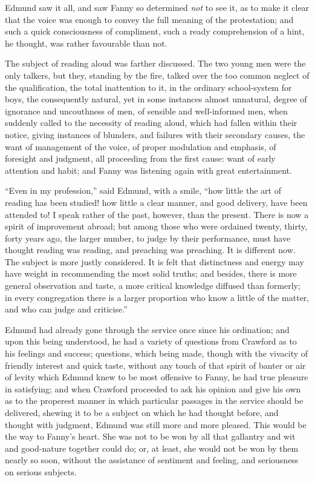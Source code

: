 \documentclass{article}
\begin{document}
Edmund saw it all, and saw Fanny so determined \emph{not} to see it,
as to make it clear that the voice was enough to convey
the full meaning of the protestation; and such a quick
consciousness of compliment, such a ready comprehension
of a hint, he thought, was rather favourable than not.

The subject of reading aloud was farther discussed.
The two young men were the only talkers, but they,
standing by the fire, talked over the too common neglect
of the qualification, the total inattention to it, in the
ordinary school-system for boys, the consequently natural,
yet in some instances almost unnatural, degree of ignorance
and uncouthness of men, of sensible and well-informed men,
when suddenly called to the necessity of reading aloud,
which had fallen within their notice, giving instances
of blunders, and failures with their secondary causes,
the want of management of the voice, of proper modulation
and emphasis, of foresight and judgment, all proceeding
from the first cause:  want of early attention and habit;
and Fanny was listening again with great entertainment.

``Even in my profession,'' said Edmund, with a smile,
``how little the art of reading has been studied! how little
a clear manner, and good delivery, have been attended to!
I speak rather of the past, however, than the present.
There is now a spirit of improvement abroad; but among
those who were ordained twenty, thirty, forty years ago,
the larger number, to judge by their performance,
must have thought reading was reading, and preaching
was preaching.  It is different now.  The subject is more
justly considered.  It is felt that distinctness and energy
may have weight in recommending the most solid truths;
and besides, there is more general observation and taste,
a more critical knowledge diffused than formerly;
in every congregation there is a larger proportion
who know a little of the matter, and who can judge
and criticise.''

Edmund had already gone through the service once since
his ordination; and upon this being understood, he had
a variety of questions from Crawford as to his feelings
and success; questions, which being made, though with the
vivacity of friendly interest and quick taste, without any
touch of that spirit of banter or air of levity which Edmund
knew to be most offensive to Fanny, he had true pleasure
in satisfying; and when Crawford proceeded to ask his
opinion and give his own as to the properest manner in which
particular passages in the service should be delivered,
shewing it to be a subject on which he had thought before,
and thought with judgment, Edmund was still more and
more pleased.  This would be the way to Fanny's heart.
She was not to be won by all that gallantry and wit and
good-nature together could do; or, at least, she would
not be won by them nearly so soon, without the assistance
of sentiment and feeling, and seriousness on serious subjects.
\end{document}
